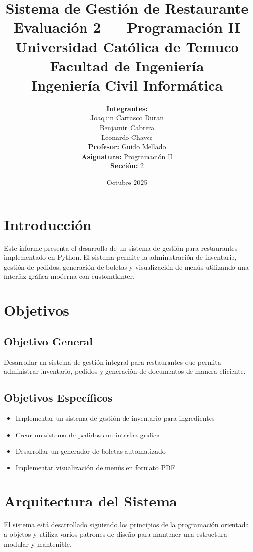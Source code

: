 \documentclass[12pt,letterpaper]{article}
\title{\textbf{Sistema de Gestión de Restaurante}\\
\large Evaluación 2 --- Programación II\\
\vspace{0.5cm}
\normalsize Universidad Católica de Temuco\\
\normalsize Facultad de Ingeniería\\
\normalsize Ingeniería Civil Informática}
\author{
    \textbf{Integrantes:}\\
    \vspace{0.3cm}
    Joaquin Carrasco Duran\\
    \vspace{0.3cm}
    Benjamin Cabrera\\
    \vspace{0.3cm}
    Leonardo Chavez\\
    \vspace{0.3cm}
    \textbf{Profesor:} Guido Mellado\\
    \vspace{0.3cm}
    \textbf{Asignatura:} Programación II\\
    \vspace{0.3cm}
    \textbf{Sección:} 2
}
\date{Octubre 2025}
\begin{document}
\maketitle
\newpage
\tableofcontents
\newpage

\section{Introducción}
Este informe presenta el desarrollo de un sistema de gestión para restaurantes implementado en Python. El sistema permite la administración de inventario, gestión de pedidos, generación de boletas y visualización de menús utilizando una interfaz gráfica moderna con customtkinter.

\section{Objetivos}
\subsection{Objetivo General}
Desarrollar un sistema de gestión integral para restaurantes que permita administrar inventario, pedidos y generación de documentos de manera eficiente.

\subsection{Objetivos Específicos}
\begin{itemize}
    \item Implementar un sistema de gestión de inventario para ingredientes
    \item Crear un sistema de pedidos con interfaz gráfica
    \item Desarrollar un generador de boletas automatizado
    \item Implementar visualización de menús en formato PDF
\end{itemize}

\section{Arquitectura del Sistema}
El sistema está desarrollado siguiendo los principios de la programación orientada a objetos y utiliza varios patrones de diseño para mantener una estructura modular y mantenible.
\end{document}
